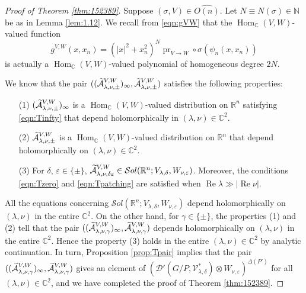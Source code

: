 \begin{proof}
[Proof of Theorem \ref{thm:152389}]
Suppose $(\sigma,V) \in \widehat {O(n)}$.  
Let 
$
N \equiv N(\sigma) \in {\mathbb{N}}
$ be as in Lemma \ref{lem:1.12}.  
We recall from \eqref{eqn:gVW}
 that the $\operatorname{Hom}_{\mathbb{C}} (V,W)$-valued function 
\begin{equation*}
 g^{V,W}(x,x_n)= (|x|^2+x_n^2)^{N} \operatorname{pr}_{V\to W} \circ\sigma(\psi_n(x,x_n))
\end{equation*}
 is actually a ${\operatorname{Hom}}_{\mathbb{C}}(V,W)$-valued polynomial
 of homogeneous degree $2N$.  



We know 
 that the pair $((\widetilde{{\mathcal{A}}}_{{\lambda},{\nu},{\pm}}^{{V,W}})_{\infty},\widetilde{{\mathcal{A}}}_{{\lambda},{\nu},{\pm}}^{{V,W}})$
 satisfies the following properties:
\begin{enumerate}
\item[{\rm{(1)}}]
$(\widetilde{{\mathcal{A}}}_{{\lambda},{\nu},{\pm}}^{{V,W}})_{\infty}$ is
 a $\operatorname{Hom}_{\mathbb{C}}(V,W)$-valued distribution 
 on ${\mathbb{R}}^n$ satisfying \eqref{eqn:Tinfty}
 that depend holomorphically
 in $(\lambda,\nu) \in {\mathbb{C}}^2$.  
\item[{\rm{(2)}}]
$\widetilde{{\mathcal{A}}}_{{\lambda},{\nu},{\pm}}^{{V,W}}$
 is a $\operatorname{Hom}_{\mathbb{C}}(V,W)$-valued distribution 
 on ${\mathbb{R}}^n$
 that depend holomorphically
 on $(\lambda, \nu) \in {\mathbb{C}}^2$.  
\item[{\rm{(3)}}]
For $\delta$, $\varepsilon \in \{\pm\}$, 
 $\widetilde{{\mathcal{A}}}_{{\lambda},{\nu},{\delta\varepsilon}}^{{V,W}}
\in {\mathcal{S}}ol({\mathbb{R}}^n; V_{\lambda, \delta}, 
 W_{\nu, \varepsilon})$.  
Moreover,
 the conditions \eqref{eqn:Tzero} and \eqref{eqn:Tpatching} are satisfied
 when $\operatorname{Re}\lambda \gg |\operatorname{Re}\nu|$.  
\end{enumerate}



All the equations concerning 
$
{\mathcal{S}}ol({\mathbb{R}}^n; V_{\lambda, \delta}, 
 W_{\nu, \varepsilon})
$
 depend holomorphically
 on $(\lambda, \nu)$ in the entire ${\mathbb{C}}^2$.  
On the other hand,
 for $\gamma \in \{\pm \}$, 
 the properties (1) and (2) tell
 that the pair 
$
   ( (\widetilde{{\mathcal{A}}}_{{\lambda},{\nu},{\gamma}}^{{V,W}})_{\infty}, 
       \widetilde{{\mathcal{A}}}_{{\lambda},{\nu},{\gamma}}^{{V,W}}
   )
$
 depends holomorphically on $(\lambda, \nu)$ in the entire ${\mathbb{C}}^2$.  
Hence the property (3) holds 
 in the entire $(\lambda, \nu)\in {\mathbb{C}}^2$
 by analytic continuation.  
In turn, 
 Proposition \ref{prop:Tpair} implies
 that the pair
$
   ((\widetilde{{\mathcal{A}}}_{{\lambda},{\nu},{\gamma}}^{{V,W}})_{\infty}, 
\widetilde{{\mathcal{A}}}_{{\lambda},{\nu},{\gamma}}^{{V,W}})
$
 gives an element of $({\mathcal{D}}'(G/P, {\mathcal{V}}_{\lambda,\delta}^{\ast}) \otimes W_{\nu,\varepsilon})^{\Delta(P')}$
 for all $(\lambda, \nu)\in {\mathbb{C}}^2$, 
 and we have completed the proof of Theorem \ref{thm:152389}.  
\end{proof}


